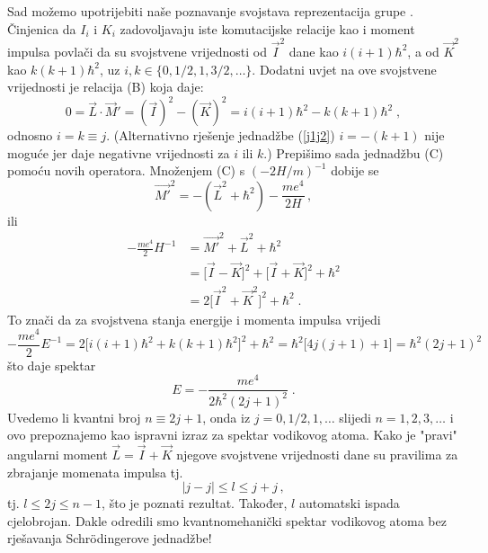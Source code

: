 Sad možemo upotrijebiti naše poznavanje svojstava reprezentacija
grupe . Činjenica da $I_i$ i $K_i$ zadovoljavaju
iste komutacijske relacije kao i moment impulsa povlači da
su svojstvene vrijednosti od $\vec{I}^2$ dane kao $i(i+1)\hbar^2$,
a od $\vec{K}^2$ kao $k(k+1)\hbar^2$, uz $i, k \in \{ 0, 1/2, 1, 3/2, \ldots\}$.
Dodatni uvjet na ove svojstvene vrijednosti je relacija (B) koja
daje:
\begin{equation}
0 = \vec{L}\cdot\vec{M}' = (\vec{I})^2 - (\vec{K})^2
  = i(i +1)\hbar^2 - k(k +1)\hbar^2 \;,
\label{j1j2}
\end{equation}
odnosno $i = k\equiv j$. (Alternativno rješenje jednadžbe (\ref{j1j2})
$i = - (k +1 )$ nije moguće jer daje negativne vrijednosti
za $i$ ili $k$.)
Prepišimo sada jednadžbu (C) pomoću novih operatora. Množenjem (C)
s $(-2H/m)^{-1}$ dobije se
\begin{equation}
   \vec{M'}^2 = -(\vec{L}^2 + \hbar^2) - \frac{me^4}{2H} \,,
\end{equation}
ili
\begin{align}
 -\frac{me^4}{2}H^{-1} &= \vec{M'}^{2} + \vec{L}^2 + \hbar^2 \\
&=\big[\vec{I} - \vec{K}\big]^2 + 
\big[\vec{I} + \vec{K}\big]^2  + \hbar^2\\
&=2\big[\vec{I}^2 + \vec{K}^2 \big]^2 + \hbar^2  \;.
\end{align}
To znači da za svojstvena stanja energije i momenta impulsa vrijedi
\begin{equation}
-\frac{me^4}{2}E^{-1} = 2\big[i(i +1)\hbar^2 + k(k+1)\hbar^2 
\big]^2 + \hbar^2   = \hbar^2 \big[ 4j(j+1) +1 \big] = \hbar^2 (2j+1)^2
\end{equation}
što daje spektar
\begin{equation}
   E = - \frac{m e^4}{2\hbar^2 (2j+1)^2} \;.
\end{equation}
Uvedemo li kvantni broj $n\equiv 2j+1$, onda iz $j=0,1/2, 1,\ldots$
slijedi $n=1,2,3,\ldots$ i ovo prepoznajemo kao ispravni izraz
za spektar vodikovog atoma.
Kako je "pravi" angularni moment $\vec{L}=\vec{I} +
\vec{K}$ njegove svojstvene vrijednosti dane su pravilima
za zbrajanje momenata impulsa tj.
\begin{equation}
    |j - j| \leq l \leq j + j \,,
\end{equation}
tj. $l \leq 2j \leq n-1$, što je poznati rezultat. Također, $l$
automatski ispada cjelobrojan. Dakle odredili smo kvantnomehanički spektar
vodikovog atoma bez rješavanja Schr\"{o}dingerove jednadžbe!

